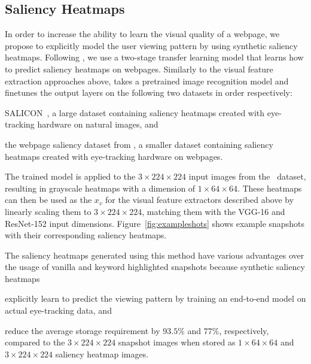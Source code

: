 \subsection{Saliency Heatmaps} \label{sec:saliency}
In order to increase the ability to learn the visual quality of a webpage, we propose to explicitly model the user viewing pattern by using synthetic saliency heatmaps. 
Following \cite{shan2017two}, we use a two-stage transfer learning model that learns how to predict saliency heatmaps on webpages.
Similarly to the visual feature extraction approaches above, \cite{shan2017two} takes a pretrained image recognition model and finetunes the output layers on the following two datasets in order respectively:
\begin{inparaenum}[(i)]
\item SALICON~\cite{jiang2015salicon}, a large dataset containing saliency heatmaps created with eye-tracking hardware on natural images, and 
\item the webpage saliency dataset from \cite{shen2014webpage}, a smaller dataset containing saliency heatmaps created with eye-tracking hardware on webpages.
\end{inparaenum}

The trained model is applied to the $3\times224\times224$ input images from the \datasetname~data\-set, resulting in grayscale heatmaps with a dimension of $1\times64\times64$. These heatmaps can then be used as the $x_{v}$ for the visual feature extractors described above by linearly scaling them to $3\times224\times224$, matching them with the VGG-16 and ResNet-152 input dimensions. Figure~\ref{fig:exampleshots} shows example snapshots with their corresponding saliency heatmaps.

The saliency heatmaps generated using this method have various advantages over the usage of vanilla and keyword highlighted snapshots because synthetic saliency heatmaps
\begin{inparaenum}[(i)]
\item explicitly learn to predict the viewing pattern by training an end-to-end model on actual eye-tracking data, and 
\item reduce the average storage requirement by $93.5\%$ and $77\%$, respectively, compared to the $3\times224\times224$ snapshot images when stored as $1\times64\times64$ and $3\times224\times224$ saliency heatmap images.
\end{inparaenum}

